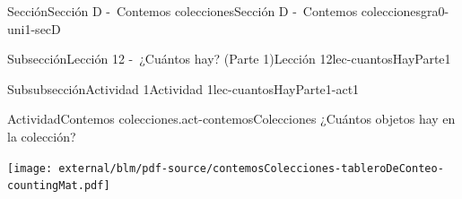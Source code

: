 \begin{sectionptx}{Sección}{Sección D -~Contemos colecciones}{}{Sección D -~Contemos colecciones}{}{}{gra0-uni1-secD}
%
%
\typeout{************************************************}
\typeout{************************************************}
%
\begin{subsectionptx}{Subsección}{Lección 12 -~¿Cuántos hay? (Parte 1)}{}{Lección 12}{}{}{lec-cuantosHayParte1}
%
%
\typeout{************************************************}
\typeout{************************************************}
%
\begin{subsubsectionptx}{Subsubsección}{Actividad 1}{}{Actividad 1}{}{}{lec-cuantosHayParte1-act1}
\begin{activity}{Actividad}{Contemos colecciones.}{act-contemosColecciones}%
¿Cuántos objetos hay en la colección?%
\par
\begin{cutoutpage}
\texttt{[image: external/blm/pdf-source/contemosColecciones-tableroDeConteo-countingMat.pdf]}


\end{cutoutpage}
\end{activity}
\end{subsubsectionptx}
\end{subsectionptx}
\end{sectionptx}
